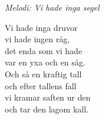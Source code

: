 {\footnotesize\textit{Melodi: Vi hade inga segel}}\par
\vspace{10pt}
Vi hade inga druvor\\
vi hade ingen råg,\\
det enda som vi hade\\
var en yxa och en såg.\\
Och så en kraftig tall\\
och efter tallens fall\\
vi kramar saften ur den\\
och tar den lagom kall.
